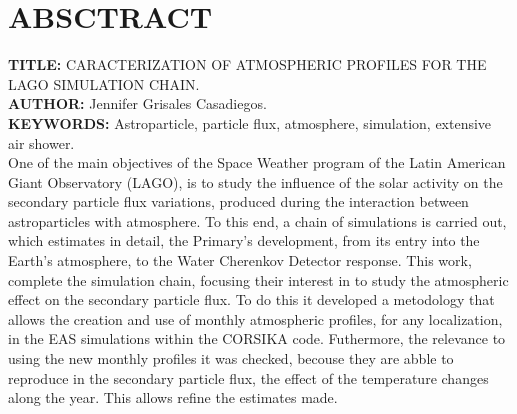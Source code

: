 \newpage
\chapter*{ABSCTRACT}
\label{sec:abst}

\textbf{TITLE:} CARACTERIZATION OF ATMOSPHERIC PROFILES FOR THE LAGO SIMULATION CHAIN.\\

\textbf{AUTHOR:} Jennifer Grisales Casadiegos.\\

\textbf{KEYWORDS: } Astroparticle, particle flux, atmosphere, simulation, extensive air shower.\\

One of the main objectives of the Space Weather program of the Latin American Giant Observatory (LAGO), is to study the influence of the solar activity on the secondary particle flux  variations, produced during the interaction between astroparticles with atmosphere. To this end, a chain of simulations is carried out, which estimates in detail, the Primary's development, from its entry into the Earth's atmosphere, to the Water Cherenkov Detector response. This work, complete the simulation chain, focusing their interest in to study the atmospheric effect on the secondary particle flux. To do this it developed a metodology that allows the creation and use of monthly atmospheric profiles, for any localization, in the EAS simulations within the CORSIKA code. Futhermore, the relevance to using the new monthly profiles it was checked, becouse they are abble to reproduce in the secondary particle flux, the effect of the temperature changes along the year. This allows refine the estimates made.
